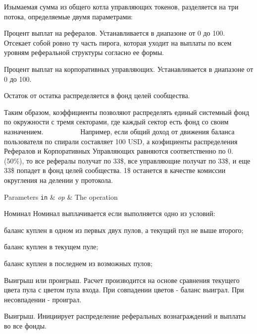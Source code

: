 Изымаемая сумма из общего котла управляющих токенов, разделяется на три потока, определяемые двумя параметрами\+:
\begin{DoxyItemize}
\item Процент выплат на рефералов. Устанавливается в диапазоне от 0 до 100. Отсекает собой ровно ту часть пирога, которая уходит на выплаты по всем уровням реферальной структуры согласно ее формы.
\item Процент выплат на корпоративных управляющих. Устанавливается в диапазоне от 0 до 100.
\item Остаток от остатка распределяется в фонд целей сообщества.
\end{DoxyItemize}

Таким образом, коэффициенты позволяют распределять единый системный фонд по окружности с тремя секторами, где каждый сектор есть фонд со своим назначением. ~\newline
~\newline
~\newline
~\newline
~\newline
~\newline
 Например, если общий доход от движения баланса пользователя по спирали составляет 100 U\+SD, а коэфициенты распределения Рефералов и Корпоративных Управляющих равняются соответственно по 0. (50\%), то все рефералы получат по 33\$, все управляющие получат по 33\$, и еще 33\$ попадет в фонд целей сообщества. 1\$ останется в качестве комиссии округления на делении у протокола.


\begin{DoxyParams}[1]{Parameters}
\mbox{\tt in}  & {\em op} & The operation \\
\hline
\end{DoxyParams}
Номинал Номинал выплачивается если выполняется одно из условий\+:
\begin{DoxyItemize}
\item баланс куплен в одном из первых двух пулов, а текущий пул не выше второго;
\item баланс куплен в текущем пуле;
\item баланс куплен в последнем из возможных пулов;
\end{DoxyItemize}

Выигрыш или проигрыш. Расчет производится на основе сравнения текущего цвета пула с цветом пула входа. При совпадении цветов -\/ баланс выиграл. При несовпадении -\/ проиграл.

Выигрыш. Инициирует распределение реферальных вознаграждений и выплаты во все фонды.

